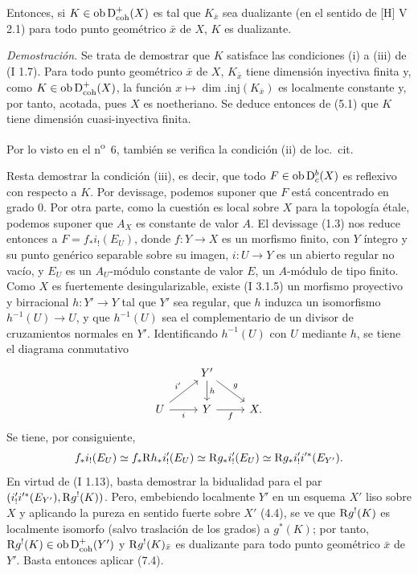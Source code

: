 Entonces, si $K\in\operatorname{ob}\mathrm{D}^{+}_{\mathrm{coh}}(X)$ es tal que $K_{\bar{x}}$ sea dualizante (en el sentido de [H] V 2.1) para todo punto geométrico $\bar{x}$ de $X$, $K$ es dualizante.

\emph{Demostración.} Se trata de demostrar que $K$ satisface las condiciones (i) a (iii) de (I 1.7). Para todo punto geométrico $\bar{x}$ de $X$, $K_{\bar{x}}$ tiene dimensión inyectiva finita y, como $K\in\operatorname{ob}\mathrm{D}^{+}_{\mathrm{coh}}(X)$, la función $x\mapsto \dim.\mathrm{inj}(K_{\bar{x}})$ es localmente constante y, por tanto, acotada, pues $X$ es noetheriano. Se deduce entonces de (5.1) que $K$ tiene dimensión cuasi-inyectiva finita.

Por lo visto en el n\textsuperscript{o}~6, también se verifica la condición (ii) de loc.~cit.

Resta demostrar la condición (iii), es decir, que todo $F\in\operatorname{ob}\mathrm{D}_c^b(X)$ es reflexivo con respecto a $K$. Por devissage, podemos suponer que $F$ está concentrado en grado $0$. Por otra parte, como la cuestión es local sobre $X$ para la topología étale, podemos suponer que $A_X$ es constante de valor $A$. El devissage (1.3) nos reduce entonces a $F=f_*i_!(E_U)$, donde $f:Y\to X$ es un morfismo finito, con $Y$ íntegro y su punto genérico separable sobre su imagen, $i:U\to Y$ es un abierto regular no vacío, y $E_U$ es un $A_U$-módulo constante de valor $E$, un $A$-módulo de tipo finito. Como $X$ es fuertemente desingularizable, existe (I 3.1.5) un morfismo proyectivo y birracional $h:Y'\to Y$ tal que $Y'$ sea regular, que $h$ induzca un isomorfismo $h^{-1}(U)\to U$, y que $h^{-1}(U)$ sea el complementario de un divisor de cruzamientos normales en $Y'$. Identificando $h^{-1}(U)$ con $U$ mediante $h$, se tiene el diagrama conmutativo
\[
\begin{tikzcd}
& Y' \arrow[d,"h"] \arrow[dr,"g"] & \\
U \arrow[ur,"i'"] \arrow[r,"i"'] & Y \arrow[r,"f"'] & X.
\end{tikzcd}
\]
Se tiene, por consiguiente,
\[
        f_*i_!(E_U)\simeq f_*\mathrm{R} h_* i'_!(E_U)\simeq \mathrm{R} g_* i'_!(E_U)\simeq \mathrm{R} g_* i'_! i'^*(E_{Y'}).
\]
En virtud de (I 1.13), basta demostrar la bidualidad para el par $(i'_!i'^*(E_{Y'}),\mathrm{R} g^!(K))$. Pero, embebiendo localmente $Y'$ en un esquema $X'$ liso sobre $X$ y aplicando la pureza en sentido fuerte sobre $X'$ (4.4), se ve que $\mathrm{R} g^!(K)$ es localmente isomorfo (salvo traslación de los grados) a $g^*(K)$; por tanto, $\mathrm{R} g^!(K)\in\operatorname{ob}\mathrm{D}^{+}_{\mathrm{coh}}(Y')$ y $\mathrm{R} g^!(K)_{\bar{x}}$ es dualizante para todo punto geométrico $\bar{x}$ de $Y'$. Basta entonces aplicar (7.4).

